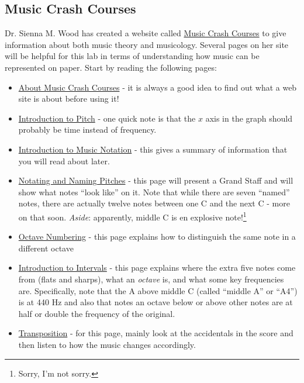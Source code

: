 \documentclass[12pt]{article}
\begin{document}
\subsection{Music Crash Courses}
Dr. Sienna M. Wood has created a website called \href{https://www.musiccrashcourses.com/index.html}{Music Crash Courses} to give information about both music theory and musicology.  Several pages on her site will be helpful for this lab in terms of understanding how music can be represented on paper.  Start by reading the following pages:
\begin{itemize}
    \item \href{https://www.musiccrashcourses.com/about.html}{About Music Crash Courses} - it is always a good idea to find out what a web site is about before using it!\
    \item \href{https://www.musiccrashcourses.com/lessons/pitch.html}{Introduction to Pitch} - one quick note is that the $x$ axis in the graph should probably be time instead of frequency.
    \item \href{https://www.musiccrashcourses.com/lessons/notation_intro.html}{Introduction to Music Notation} - this gives a summary of information that you will read about later.
    \item \href{https://www.musiccrashcourses.com/lessons/notating_naming_pitches.html}{Notating and Naming Pitches} - this page will present a Grand Staff and will show what notes ``look like'' on it.  Note that while there are seven ``named'' notes, there are actually twelve notes between one C and the next C - more on that soon.  \textit{Aside}: apparently, middle C is en explosive note!\footnote{Sorry, I'm not sorry.}
    \item \href{https://www.musiccrashcourses.com/lessons/octave_numbering.html}{Octave Numbering} - this page explains how to distinguish the same note in a different octave
    \item \href{https://www.musiccrashcourses.com/lessons/intervals.html}{Introduction to Intervals} - this page explains where the extra five notes come from (flats and sharps), what an \textit{octave} is, and what some key frequencies are.  Specifically, note that the A above middle C (called ``middle A'' or ``A4'') is at 440 Hz and also that notes an octave below or above other notes are at half or double the frequency of the original.
    \item\href{https://www.musiccrashcourses.com/lessons/transposition.html}{Transposition} - for this page, mainly look at the accidentals in the score and then listen to how the music changes accordingly.

\end{itemize}
\end{document}
